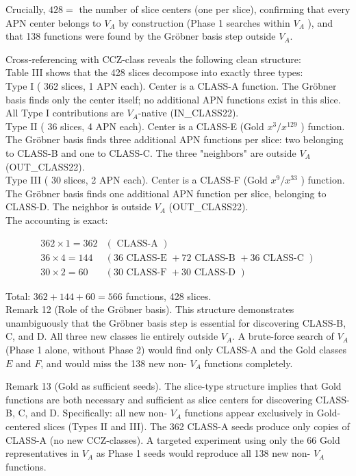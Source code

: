 \documentclass[10pt]{article}
\begin{document}
Crucially, $428=$ the number of slice centers (one per slice), confirming that every APN center belongs to $V_{A}$ by construction (Phase 1 searches within $V_{A}$ ), and that 138 functions were found by the Gröbner basis step outside $V_{A}$.

Cross-referencing with CCZ-class reveals the following clean structure:\\
Table III shows that the 428 slices decompose into exactly three types:\\
Type I ( 362 slices, 1 APN each). Center is a CLASS-A function. The Gröbner basis finds only the center itself; no additional APN functions exist in this slice. All Type I contributions are $V_{A}$-native (IN\_CLASS22).\\
Type II ( 36 slices, 4 APN each). Center is a CLASS-E (Gold $x^{3} / x^{129}$ ) function. The Gröbner basis finds three additional APN functions per slice: two belonging to CLASS-B and one to CLASS-C. The three "neighbors" are outside $V_{A}$ (OUT\_CLASS22).\\
Type III ( 30 slices, 2 APN each). Center is a CLASS-F (Gold $x^{9} / x^{33}$ ) function. The Gröbner basis finds one additional APN function per slice, belonging to CLASS-D. The neighbor is outside $V_{A}$ (OUT\_CLASS22).\\
The accounting is exact:

$$
\begin{aligned}
362 \times 1=362 & (\text { CLASS-A }) \\
36 \times 4=144 & (36 \text { CLASS-E }+72 \text { CLASS-B }+36 \text { CLASS-C }) \\
30 \times 2=60 & (30 \text { CLASS-F }+30 \text { CLASS-D })
\end{aligned}
$$

Total: $362+144+60=566$ functions, 428 slices.\\
Remark 12 (Role of the Gröbner basis). This structure demonstrates unambiguously that the Gröbner basis step is essential for discovering CLASS-B, C, and D. All three new classes lie entirely outside $V_{A}$. A brute-force search of $V_{A}$ (Phase 1 alone, without Phase 2) would find only CLASS-A and the Gold classes $E$ and $F$, and would miss the 138 new non- $V_{A}$ functions completely.

Remark 13 (Gold as sufficient seeds). The slice-type structure implies that Gold functions are both necessary and sufficient as slice centers for discovering CLASS-B, C, and D. Specifically: all new non- $V_{A}$ functions appear exclusively in Gold-centered slices (Types II and III). The 362 CLASS-A seeds produce only copies of CLASS-A (no new CCZ-classes). A targeted experiment using only the 66 Gold representatives in $V_{A}$ as Phase 1 seeds would reproduce all 138 new non- $V_{A}$ functions.
\end{document}
